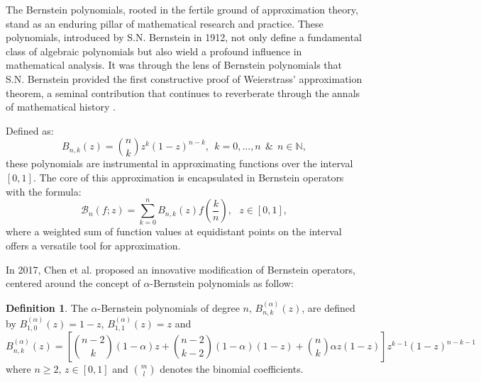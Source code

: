 \documentclass[preprint,12pt]{elsarticle}
\theoremstyle{definition}
\newtheorem{definition}{Definition}
\theoremstyle{theorem}
\theoremstyle{lemma}
\theoremstyle{example}
\theoremstyle{remark}
\theoremstyle{prop}
\begin{document}
%





The Bernstein polynomials, rooted in the fertile ground of approximation theory, stand as an enduring pillar of mathematical research and practice. These polynomials, introduced by S.N. Bernstein in 1912, not only define a fundamental class of algebraic polynomials but also wield a profound influence in mathematical analysis. It was through the lens of Bernstein polynomials that S.N. Bernstein provided the first constructive proof of Weierstrass' approximation theorem, a seminal contribution that continues to reverberate through the annals of mathematical history \cite{farouki2012bernstein}.

Defined as:
\[B_{n,k}(z) ={n \choose k} z^k(1-z)^{n-k}, ~~k=0,...,n ~~ \& ~~ n\in \mathbb{N},\]
these polynomials are instrumental in approximating functions over the interval \([0,1]\). The core of this approximation is encapsulated in  Bernstein operators with the formula:
\[ \mathcal{B}_n(f;z) =\sum_{k=0}^n B_{n,k}(z)f(\frac{k}{n}),  ~~~ z\in [0,1],\]
where a weighted sum of function values at equidistant points on the interval offers a versatile tool for approximation.

In 2017, Chen et al. \cite{chen2017approximation} proposed an innovative modification of Bernstein operators, centered around the concept of $\alpha$-Bernstein polynomials as follow:
\begin{definition}\cite{chen2017approximation}
The $ \alpha $-Bernstein polynomials  of degree $n$, $B_{n,k}^{(\alpha)}(z)$, are defined by $B_{1,0}^{(\alpha)}(z)=1-z$, $B_{1,1}^{(\alpha)}(z)=z$ and
\begin{equation} 
B_{n,k}^{(\alpha)}(z) = \left[ \binom{n-2}{k}(1-\alpha)z + \binom{n-2}{k-2}(1-\alpha)\left(1-z\right) + \binom{n}{k}\alpha  z(1-z) \right]z^{k-1}(1-z)^{n-k-1}   \label{chenformula}
\end{equation}
where $n \geq 2$, $z \in[0, 1]$ and $\binom{m}{l}$ denotes  the binomial coefficients.
\end{definition}
\end{document}
